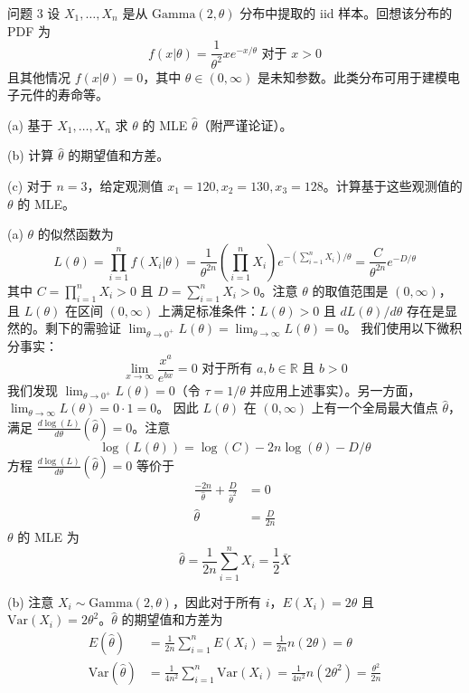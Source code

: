 \begin{questions}
\question 问题 3 设 $X_1, \dots, X_n$ 是从 $\text{Gamma}(2, \theta)$ 分布中提取的 iid 样本。回想该分布的 PDF 为
\[
f(x|\theta) = \frac{1}{\theta^2} x e^{-x/\theta} \text{ 对于 } x > 0
\]
且其他情况 $f(x|\theta) = 0$，其中 $\theta \in (0, \infty)$ 是未知参数。此类分布可用于建模电子元件的寿命等。

(a) 基于 $X_1, \dots, X_n$ 求 $\theta$ 的 MLE $\hat{\theta}$（附严谨论证）。

(b) 计算 $\hat{\theta}$ 的期望值和方差。

(c) 对于 $n = 3$，给定观测值 $x_1 = 120, x_2 = 130, x_3 = 128$。计算基于这些观测值的 $\theta$ 的 MLE。

\begin{solution}
(a) $\theta$ 的似然函数为
\[
L(\theta) = \prod_{i=1}^n f(X_i|\theta) = \frac{1}{\theta^{2n}} \left(\prod_{i=1}^n X_i\right) e^{-(\sum_{i=1}^n X_i)/\theta} = \frac{C}{\theta^{2n}} e^{-D/\theta}
\]
其中 $C = \prod_{i=1}^n X_i > 0$ 且 $D = \sum_{i=1}^n X_i > 0$。注意 $\theta$ 的取值范围是 $(0, \infty)$，且 $L(\theta)$ 在区间 $(0, \infty)$ 上满足标准条件：$L(\theta) > 0$ 且 $dL(\theta)/d\theta$ 存在是显然的。剩下的需验证 $\lim_{\theta \to 0^+} L(\theta) = \lim_{\theta \to \infty} L(\theta) = 0$。
我们使用以下微积分事实：
\[
\lim_{x \to \infty} \frac{x^a}{e^{bx}} = 0 \text{ 对于所有 } a, b \in \mathbb{R} \text{ 且 } b > 0
\]
我们发现 $\lim_{\theta \to 0^+} L(\theta) = 0$（令 $\tau = 1/\theta$ 并应用上述事实）。另一方面，$\lim_{\theta \to \infty} L(\theta) = 0 \cdot 1 = 0$。
因此 $L(\theta)$ 在 $(0, \infty)$ 上有一个全局最大值点 $\hat{\theta}$，满足 $\frac{d\log(L)}{d\theta}(\hat{\theta}) = 0$。注意
\[
\log(L(\theta)) = \log(C) - 2n\log(\theta) - D/\theta
\]
方程 $\frac{d\log(L)}{d\theta}(\hat{\theta}) = 0$ 等价于
\begin{align*}
\frac{-2n}{\hat{\theta}} + \frac{D}{\hat{\theta}^2} &= 0 \\
\hat{\theta} &= \frac{D}{2n}
\end{align*}
$\theta$ 的 MLE 为
\[
\hat{\theta} = \frac{1}{2n} \sum_{i=1}^n X_i = \frac{1}{2} \bar{X}
\]

(b) 注意 $X_i \sim \text{Gamma}(2, \theta)$，因此对于所有 $i$，$E(X_i) = 2\theta$ 且 $\text{Var}(X_i) = 2\theta^2$。$\hat{\theta}$ 的期望值和方差为
\begin{align*}
E(\hat{\theta}) &= \frac{1}{2n} \sum_{i=1}^n E(X_i) = \frac{1}{2n} n(2\theta) = \theta \\
\text{Var}(\hat{\theta}) &= \frac{1}{4n^2} \sum_{i=1}^n \text{Var}(X_i) = \frac{1}{4n^2} n(2\theta^2) = \frac{\theta^2}{2n}
\end{align*}


\end{solution}
\end{questions}
